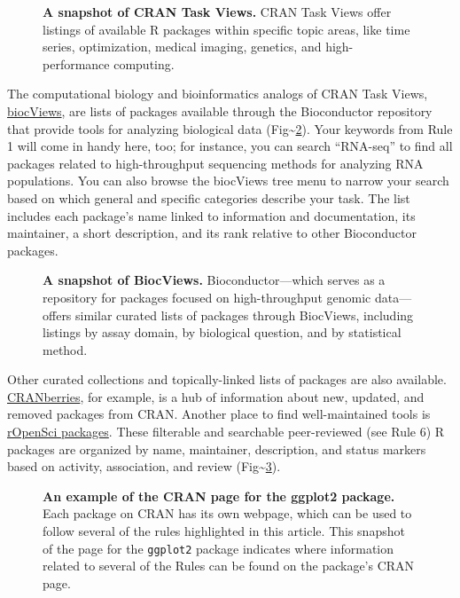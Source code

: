 \documentclass[10pt,letterpaper]{article}
\begin{document}
\begin{figure}[!h]
\caption{{\bf A snapshot of CRAN Task Views.}
CRAN Task Views offer listings of available R packages within specific
topic areas, like time series, optimization, medical imaging, genetics, 
and high-performance computing.}
\label{fig1}
\end{figure}

The computational biology and bioinformatics analogs of CRAN Task Views,
\href{https://www.bioconductor.org/packages/release/BiocViews.html\#___Software}{biocViews},
are lists of packages available through the Bioconductor repository that
provide tools for analyzing biological data
(Fig\textasciitilde{}\ref{fig2}). Your keywords from Rule 1 will come in
handy here, too; for instance, you can search ``RNA-seq'' to find all
packages related to high-throughput sequencing methods for analyzing RNA
populations. You can also browse the biocViews tree menu to narrow your
search based on which general and specific categories describe your
task. The list includes each package's name linked to information and
documentation, its maintainer, a short description, and its rank
relative to other Bioconductor packages.

\begin{figure}[!h]
\caption{{\bf A snapshot of BiocViews.}
Bioconductor---which serves as a repository for packages focused on
high-throughput genomic data---offers similar curated lists of packages through
BiocViews, including listings by assay domain, by biological question, and by
statistical method.}
\label{fig2}
\end{figure}

Other curated collections and topically-linked lists of packages are
also available.
\href{http://dirk.eddelbuettel.com/cranberries/index.html}{CRANberries},
for example, is a hub of information about new, updated, and removed
packages from CRAN. Another place to find well-maintained tools is
\href{https://ropensci.org/packages/}{rOpenSci packages}. These
filterable and searchable peer-reviewed (see Rule 6) R packages are
organized by name, maintainer, description, and status markers based on
activity, association, and review (Fig\textasciitilde{}\ref{fig3}).

\begin{figure}[!h]
\caption{{\bf An example of the CRAN page for the ggplot2 package.}
Each package on CRAN has its own webpage, which can be used to follow several of the rules highlighted in this article. This snapshot of the page for the 
\texttt{ggplot2} package indicates where information related to several of the Rules can be found on the package's CRAN page.}
\label{fig3}
\end{figure}
\end{document}
